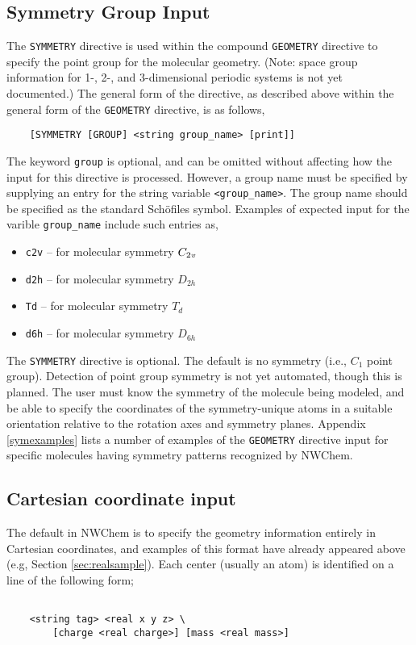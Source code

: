 \subsection{Symmetry Group Input}

The \verb+SYMMETRY+ directive is used within the compound \verb+GEOMETRY+
directive to specify the point group for the
molecular geometry. (Note: space group information for 1-, 2-, and
3-dimensional periodic systems is not yet documented.)
The general form of the directive, as described above within the general
form of the \verb+GEOMETRY+ directive, is as follows,
\begin{verbatim}
    [SYMMETRY [GROUP] <string group_name> [print]]
\end{verbatim}
The keyword \verb+group+ is optional, and can be omitted without affecting
how the input for this directive is processed.
However, a group name must be specified by supplying an entry for the
string variable \verb+<group_name>+.  The
group name should be specified as the standard Sch\"{o}files symbol.
Examples of expected input for the varible \verb+group_name+ include
such entries as,

\begin{itemize}
\item \verb+c2v+ -- for molecular symmetry $C_{2{\it v}}$
\item \verb+d2h+ -- for molecular symmetry $D_{2h}$
\item \verb+Td+ -- for molecular symmetry $T_d$
\item \verb+d6h+ -- for molecular symmetry $D_{6h}$
\end{itemize}

The \verb+SYMMETRY+ directive is optional.  The default is no symmetry 
(i.e., $C_1$ point group). Detection of point
group symmetry is not yet automated, though this is planned.  The user
must know the symmetry of the molecule being modeled, and be able
to specify the coordinates of the symmetry-unique atoms in a suitable
orientation relative to the rotation axes and symmetry planes.
Appendix \ref{symexamples} lists a number of examples of the
\verb+GEOMETRY+ directive input for specific molecules having symmetry
patterns recognized by NWChem.

\subsection{Cartesian coordinate input}
\label{sec:cart}

The default in NWChem is to specify the geometry information entirely
in Cartesian coordinates, and examples of this format have already
appeared above (e.g, Section \ref{sec:realsample}). Each center
(usually an atom) is identified on a line of the following form;
\begin{verbatim}

    <string tag> <real x y z> \
        [charge <real charge>] [mass <real mass>]

\end{verbatim}

